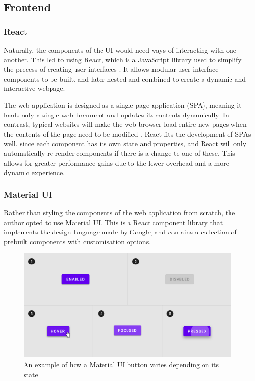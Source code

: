 \subsection{Frontend}

\subsubsection{React}
\noindent Naturally, the components of the UI would need ways of interacting with one another. This led to using React, which is a JavaScript library used to simplify the process of creating user interfaces \cite{whatisReact}. It allows modular user interface components to be built, and later nested and combined to create a dynamic and interactive webpage. 

\par\null\par
\noindent The web application is designed as a single page application (SPA), meaning it loads only a single web document and updates its contents dynamically. In contrast, typical websites will make the web browser load entire new pages when the contents of the page need to be modified \cite{singlepageapp}. React fits the development of SPAs well, since each component has its own state and properties, and React will only automatically re-render components if there is a change to one of these.
This allows for greater performance gains due to the lower overhead and a more dynamic experience.


\subsubsection{Material UI}
 Rather than styling the components of the web application from scratch, the author opted to use Material UI. This is a React component library that implements the design language made by Google, and contains a collection of prebuilt components with customisation options.

\begin{figure}[H]
    \centering
    \includegraphics[scale=0.35]{./images/materialUIbutton.png}
    \caption{An example of how a Material UI button varies depending on its state \cite{materialUIbuttons}}
\end{figure}

